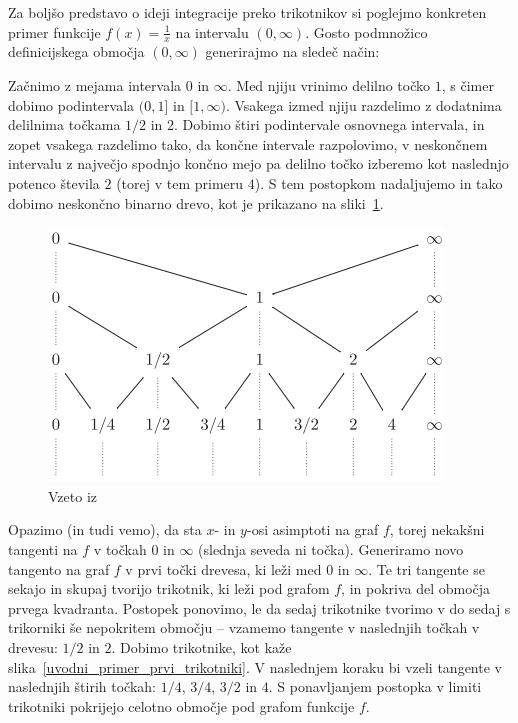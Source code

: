 \documentclass[a4paper, 12pt, titlepage]{article}
\begin{document}
Za boljšo predstavo o ideji integracije preko trikotnikov si poglejmo konkreten primer funkcije $ f(x) = \frac{1}{x} $ na intervalu $ (0, \infty) $. Gosto podmnožico definicijskega območja $ (0, \infty) $ generirajmo na sledeč način:

Začnimo z mejama intervala $ 0 $ in $ \infty $. Med njiju vrinimo delilno točko $ 1 $, s čimer dobimo podintervala $ (0, 1] $ in $ [1, \infty) $. Vsakega izmed njiju razdelimo z dodatnima delilnima točkama $ 1/2 $ in $ 2 $. Dobimo štiri podintervale osnovnega intervala, in zopet vsakega razdelimo tako, da končne intervale razpolovimo, v neskončnem intervalu z največjo spodnjo končno mejo pa delilno točko izberemo kot naslednjo potenco števila $ 2 $ (torej v tem primeru $ 4 $). S tem postopkom nadaljujemo in tako dobimo neskončno binarno drevo, kot je prikazano na sliki~\ref{uvodni_primer_drevo}.

\begin{figure}[h]
    \centering
    \includegraphics{slike/uvodni_primer_drevo.png}
    \caption{Vzeto iz~\cite{osnovni_clanek}}
    \label{uvodni_primer_drevo}
\end{figure}

Opazimo (in tudi vemo), da sta $ x $- in $ y $-osi asimptoti na graf $ f $, torej nekakšni tangenti na $ f $ v točkah $ 0 $ in $ \infty $ (slednja seveda ni točka). Generiramo novo tangento na graf $ f $ v prvi točki drevesa, ki leži med $ 0 $ in $ \infty $. Te tri tangente se sekajo in skupaj tvorijo trikotnik, ki leži pod grafom $ f $, in pokriva del območja prvega kvadranta. Postopek ponovimo, le da sedaj trikotnike tvorimo v do sedaj s trikorniki še nepokritem območju -- vzamemo tangente v naslednjih točkah v drevesu: $ 1/2 $ in $ 2 $. Dobimo trikotnike, kot kaže slika~\ref{uvodni_primer_prvi_trikotniki}. V naslednjem koraku bi vzeli tangente v naslednjih štirih točkah: $ 1/4 $, $ 3/4 $, $ 3/2 $ in $ 4 $. S ponavljanjem postopka v limiti trikotniki pokrijejo celotno območje pod grafom funkcije $ f $.
\end{document}

